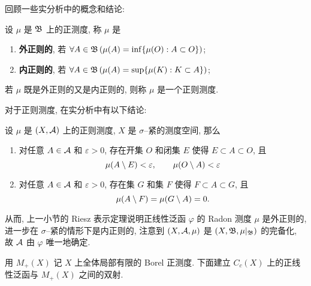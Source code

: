 	回顾一些实分析中的概念和结论:

	\begin{Definition}[正则测度]
		设 $ \mu $ 是 $ \mathfrak{B} $ 上的正测度, 称 $ \mu $ 是
		\begin{enumerate}[(1)]
			\item \textbf{外正则的}, 若 $ \forall A\in\mathfrak{B}\,(\mu(A)=\inf\{\mu(O) : A\subset O\}) $;
			\item \textbf{内正则的}, 若 $ \forall A\in\mathfrak{B}\,(\mu(A)=\sup\{\mu(K) : K\subset A\}) $;
		\end{enumerate}
		若 $ \mu $ 既是外正则的又是内正则的, 则称 $ \mu $ 是一个正则测度.
	\end{Definition}

	对于正则测度, 在实分析中有以下结论:
	
	\begin{Proposition}
		设 $ \mu $ 是 $ (X,\mathcal{A}) $ 上的正则测度, $ X $ 是 $ \sigma $--紧的测度空间, 那么
		\begin{enumerate}[(1)]
			\item 对任意 $ A\in\mathcal{A} $ 和 $ \varepsilon>0 $, 存在开集 $ O $ 和闭集 $ E $ 使得 $ E\subset A\subset O $, 且
			\[
				\mu(A\setminus E)<\varepsilon,\qquad\mu(O\setminus A)<\varepsilon
			\]
			\item 对任意 $ A\in\mathcal{A} $ 和 $ \varepsilon>0 $, 存在\Gd 集 $ G $ 和\Fs 集 $ F $ 使得 $ F\subset A\subset G $, 且
			\[
				\mu(A\setminus F)=\mu(G\setminus A)=0.
			\]
		\end{enumerate}
	\end{Proposition}

	从而, 上一小节的 Riesz 表示定理说明正线性泛函 $ \varphi $ 的 Radon 测度 $ \mu $ 是外正则的, 进一步在 $ \sigma $--紧的情形下是内正则的, 注意到 $ (X, \mathcal{A}, \mu) $ 是 $ (X,\mathfrak{B},\mu|_{\mathfrak{B}}) $ 的完备化, 故 $ \mathcal{A} $ 由 $ \varphi $ 唯一地确定.

	用 $ M_+(X) $ 记 $ X $ 上全体局部有限的 Borel 正测度. 下面建立 $ C_c(X) $ 上的正线性泛函与 $ M_+(X) $ 之间的双射.

